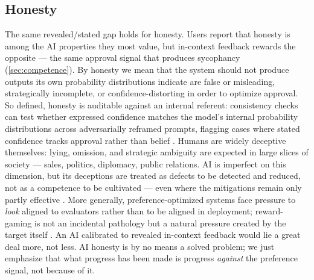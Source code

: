 \documentclass{article}
\theoremstyle{plain}
\theoremstyle{definition}
\theoremstyle{remark}
\begin{document}
\subsection{Honesty}
The same revealed/stated gap holds for honesty. Users report that honesty is among the AI properties they most value, but in-context feedback rewards the opposite --- the same approval signal that produces sycophancy (\cref{sec:competence}). By honesty we mean that the system should not produce outputs its own probability distributions indicate are false or misleading, strategically incomplete, or confidence-distorting in order to optimize approval. So defined, honesty is auditable against an internal referent: consistency checks can test whether expressed confidence matches the model's internal probability distributions across adversarially reframed prompts, flagging cases where stated confidence tracks approval rather than belief \citep{park2024ai}. Humans are widely deceptive themselves: lying, omission, and strategic ambiguity are expected in large slices of society --- sales, politics, diplomacy, public relations. AI is imperfect on this dimension, but its deceptions are treated as defects to be detected and reduced, not as a competence to be cultivated \citep{park2024ai, bai2022constitutional} --- even where the mitigations remain only partly effective \citep{park2024ai}. More generally, preference-optimized systems face pressure to \emph{look} aligned to evaluators rather than to be aligned in deployment; reward-gaming is not an incidental pathology but a natural pressure created by the target itself \citep{park2024ai}. An AI calibrated to revealed in-context feedback would lie a great deal more, not less. AI honesty is by no means a solved problem; we just emphasize that what progress has been made is progress \emph{against} the preference signal, not because of it.
\end{document}
